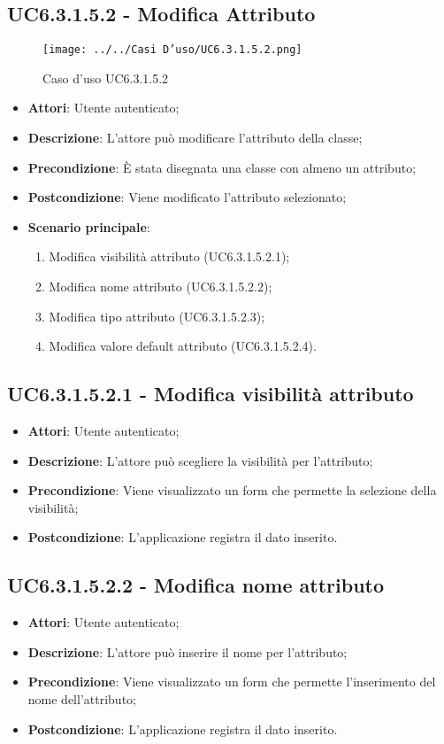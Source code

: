 \subsection{UC6.3.1.5.2 - Modifica Attributo} 
\label{ssec:UC6.3.1.5.2} 
\begin{figure}[h!] 
\centering 
\texttt{[image: ../../Casi D'uso/UC6.3.1.5.2.png]} 
\caption{Caso d'uso UC6.3.1.5.2} 
 \end{figure} 
\begin{itemize} 
\item \textbf{Attori}: Utente autenticato;
\item \textbf{Descrizione}: L'attore può modificare l'attributo della classe;
\item \textbf{Precondizione}: È stata disegnata una classe con almeno un attributo;
\item \textbf{Postcondizione}: Viene modificato l'attributo selezionato;
\item \textbf{Scenario principale}: \begin{enumerate}\item Modifica visibilità attributo (UC6.3.1.5.2.1);\item Modifica nome attributo (UC6.3.1.5.2.2);\item Modifica tipo attributo (UC6.3.1.5.2.3);\item Modifica valore default attributo (UC6.3.1.5.2.4). 
 \end{enumerate}
\end{itemize} 
\subsection{UC6.3.1.5.2.1 - Modifica visibilità attributo} 
\label{ssec:UC6.3.1.5.2.1} 
\begin{itemize} 
\item \textbf{Attori}: Utente autenticato;
\item \textbf{Descrizione}: L'attore può scegliere la visibilità per l'attributo;
\item \textbf{Precondizione}: Viene visualizzato un form che permette la selezione della visibilità;
\item \textbf{Postcondizione}: L'applicazione registra il dato inserito.
\end{itemize} 
\subsection{UC6.3.1.5.2.2 - Modifica nome attributo} 
\label{ssec:UC6.3.1.5.2.2} 
\begin{itemize} 
\item \textbf{Attori}: Utente autenticato;
\item \textbf{Descrizione}: L'attore può inserire il nome per l'attributo;
\item \textbf{Precondizione}: Viene visualizzato un form che permette l'inserimento del nome dell'attributo;
\item \textbf{Postcondizione}: L'applicazione registra il dato inserito.
\end{itemize} 
